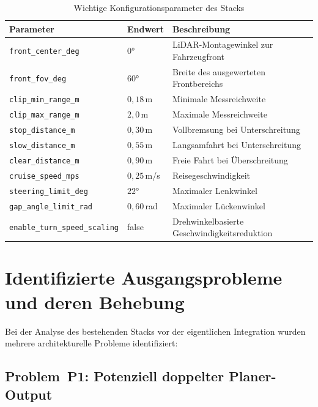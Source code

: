 \begin{table}[H]
\centering
\caption{Wichtige Konfigurationsparameter des Stacks}
\label{tab:params}
\begin{tabularx}{\textwidth}{llX}
\toprule
\textbf{Parameter} & \textbf{Endwert} & \textbf{Beschreibung} \\
\midrule
\texttt{front\_center\_deg}        & $0°$      & LiDAR-Montagewinkel zur Fahrzeugfront \\
\texttt{front\_fov\_deg}           & $60°$     & Breite des ausgewerteten Frontbereichs \\
\texttt{clip\_min\_range\_m}       & $0{,}18$\,m & Minimale Messreichweite \\
\texttt{clip\_max\_range\_m}       & $2{,}0$\,m  & Maximale Messreichweite \\
\texttt{stop\_distance\_m}         & $0{,}30$\,m & Vollbremsung bei Unterschreitung \\
\texttt{slow\_distance\_m}         & $0{,}55$\,m & Langsamfahrt bei Unterschreitung \\
\texttt{clear\_distance\_m}        & $0{,}90$\,m & Freie Fahrt bei Überschreitung \\
\texttt{cruise\_speed\_mps}        & $0{,}25$\,m/s & Reisegeschwindigkeit \\
\texttt{steering\_limit\_deg}      & $22°$     & Maximaler Lenkwinkel \\
\texttt{gap\_angle\_limit\_rad}    & $0{,}60$\,rad & Maximaler Lückenwinkel \\
\texttt{enable\_turn\_speed\_scaling} & false  & Drehwinkelbasierte Geschwindigkeitsreduktion \\
\bottomrule
\end{tabularx}
\end{table}

\section{Identifizierte Ausgangsprobleme und deren Behebung}

Bei der Analyse des bestehenden Stacks vor der eigentlichen Integration
wurden mehrere architekturelle Probleme identifiziert:

\subsection{Problem~P1: Potenziell doppelter Planer-Output}

